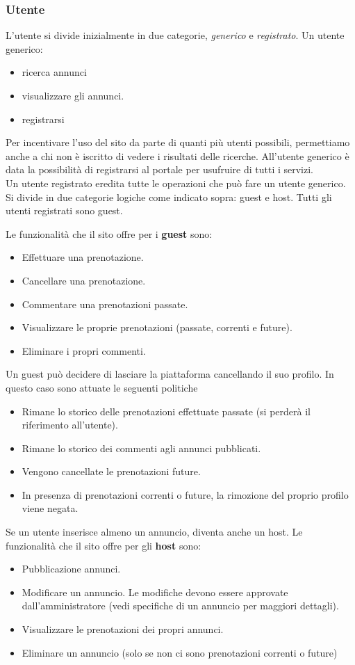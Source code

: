 \documentclass[1_relazione.tex]{subfiles}
\begin{document}
\subsubsection{Utente} 
L'utente si divide inizialmente in due categorie, \textit{generico} e \textit{registrato}. Un utente generico:
\begin{itemize}
\item ricerca annunci 
\item visualizzare gli annunci.
\item registrarsi
\end{itemize}
 Per incentivare l'uso del sito da parte di quanti più utenti possibili, permettiamo anche a chi non è iscritto di vedere i risultati delle ricerche. All'utente generico è data la possibilità di registrarsi al portale per usufruire di tutti i servizi.  \\
Un utente registrato eredita tutte le operazioni che può fare un utente generico. Si divide in due categorie logiche come indicato sopra: guest e host. Tutti gli utenti registrati sono guest. 

Le funzionalità che il sito offre per i \textbf{guest} sono: 
\begin{itemize}
\item Effettuare una prenotazione.
\item Cancellare una prenotazione.
\item Commentare una prenotazioni passate.
\item Visualizzare le proprie prenotazioni (passate, correnti e future).
\item Eliminare i propri commenti.
\end{itemize}

Un guest può decidere di lasciare la piattaforma cancellando il suo profilo. In questo caso sono attuate le seguenti politiche

\begin{itemize}
\item Rimane lo storico delle prenotazioni effettuate passate (si perderà il riferimento all'utente).
\item Rimane lo storico dei commenti agli annunci pubblicati.
\item Vengono cancellate le prenotazioni future.
\item In presenza di prenotazioni correnti o future, la rimozione del proprio profilo viene negata.
\end{itemize}

Se un utente inserisce almeno un annuncio, diventa anche un host. Le funzionalità che il sito offre per gli \textbf{host} sono: 
\begin{itemize}
\item Pubblicazione annunci.
\item Modificare un annuncio. Le modifiche devono essere approvate dall'amministratore (vedi specifiche di un annuncio per maggiori dettagli).
\item Visualizzare le prenotazioni dei propri annunci.
\item Eliminare un annuncio (solo se non ci sono prenotazioni correnti o future)
\end{itemize}
\end{document}
